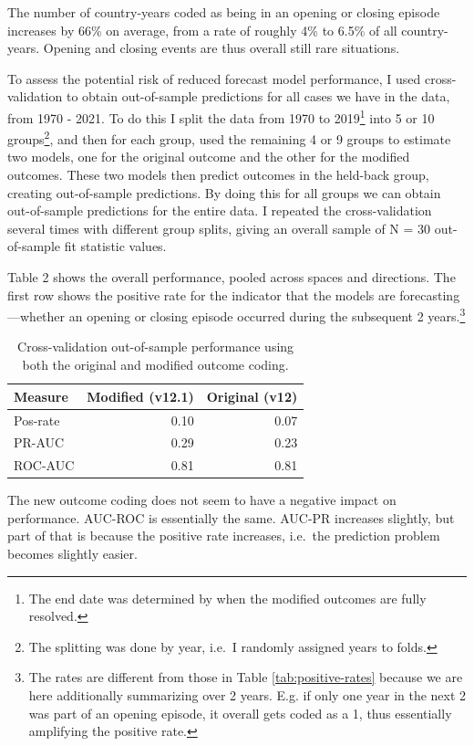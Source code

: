 \documentclass[
  11pt,
]{article}
\begin{document}
The number of country-years coded as being in an opening or closing
episode increases by 66\% on average, from a rate of roughly 4\% to
6.5\% of all country-years. Opening and closing events are thus overall
still rare situations.

To assess the potential risk of reduced forecast model performance, I
used cross-validation to obtain out-of-sample predictions for all cases
we have in the data, from 1970 - 2021. To do this I split the data from
1970 to 2019\footnote{The end date was determined by when the modified
  outcomes are fully resolved.} into 5 or 10 groups\footnote{The
  splitting was done by year, i.e.~I randomly assigned years to folds.},
and then for each group, used the remaining 4 or 9 groups to estimate
two models, one for the original outcome and the other for the modified
outcomes. These two models then predict outcomes in the held-back group,
creating out-of-sample predictions. By doing this for all groups we can
obtain out-of-sample predictions for the entire data. I repeated the
cross-validation several times with different group splits, giving an
overall sample of N = 30 out-of-sample fit statistic values.

Table 2 shows the overall performance, pooled across spaces and
directions. The first row shows the positive rate for the indicator that
the models are forecasting---whether an opening or closing episode
occurred during the subsequent 2 years.\footnote{The rates are different
  from those in Table \ref{tab:positive-rates} because we are here
  additionally summarizing over 2 years. E.g. if only one year in the
  next 2 was part of an opening episode, it overall gets coded as a 1,
  thus essentially amplifying the positive rate.}

\begin{table}
\centering
\caption{Cross-validation out-of-sample performance using both the original and modified outcome coding.\label{tab:cv-results}}
\begin{tabular}{lrr}
\toprule
Measure & Modified (v12.1) & Original (v12) \\
\midrule
Pos-rate & 0.10 & 0.07\\
PR-AUC & 0.29 & 0.23\\
ROC-AUC & 0.81 & 0.81\\
\bottomrule
\end{tabular}
\end{table}

The new outcome coding does not seem to have a negative impact on
performance. AUC-ROC is essentially the same. AUC-PR increases slightly,
but part of that is because the positive rate increases, i.e.~the
prediction problem becomes slightly easier.
\end{document}
